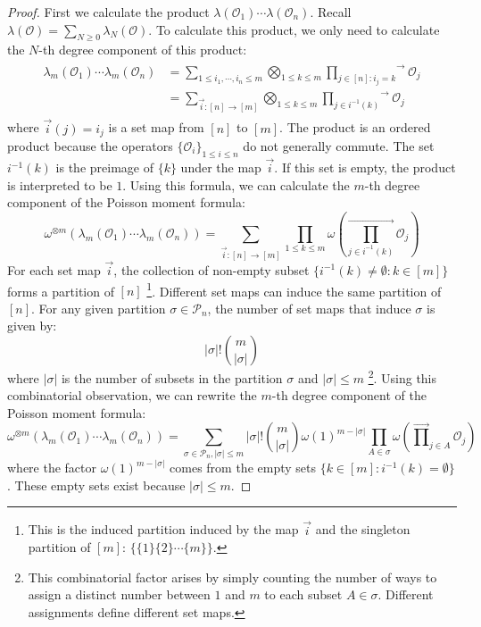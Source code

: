\documentclass[a4paper,11pt]{article}
\theoremstyle{definition}
\numberwithin{equation}{section}
\begin{document}
\begin{proof}
    First we calculate the product $\lambda(\mathcal{O}_1)\cdots\lambda(\mathcal{O}_n)$. Recall $\lambda(\mathcal{O}) = \sum_{N\geq 0}\lambda_N(\mathcal{O})$. To calculate this product, we only need to calculate the $N$-th degree component of this product:
    \begin{align}
        \begin{split}
            \lambda_m(\mathcal{O}_1)\cdots\lambda_m(\mathcal{O}_n) &= \sum_{1\leq i_1,\cdots,i_n\leq m}\bigotimes_{1\leq k\leq m}\overrightarrow{\prod_{j\in[n]:i_j = k}}\mathcal{O}_j
            \\& = \sum_{\vec{i}:[n]
            \rightarrow [m]}\bigotimes_{1\leq k\leq m}\overrightarrow{\prod_{j\in i^{-1}(k)}}\mathcal{O}_j
        \end{split}
    \end{align}
    where $\vec{i}(j) = i_j$ is a set map from $[n]$ to $[m]$. The product is an ordered product because the operators $\{\mathcal{O}_i\}_{1\leq i\leq n}$ do not generally commute. The set $i^{-1}(k)$ is the preimage of $\{k\}$ under the map $\vec{i}$. If this set is empty, the product is interpreted to be $1$. Using this formula, we can calculate the $m$-th degree component of the Poisson moment formula:
    \begin{equation}\label{equation:combinatorial_moment}
        \omega^{\otimes m}(\lambda_m(\mathcal{O}_1)\cdots\lambda_m(\mathcal{O}_n)) = \sum_{\vec{i}:[n]\rightarrow[m]}\prod_{1\leq k\leq m}\omega(\overrightarrow{\prod_{j\in i^{-1}(k)}}\mathcal{O}_j)
    \end{equation}
    For each set map $\vec{i}$, the collection of non-empty subset $\{i^{-1}(k)\neq\emptyset:k\in [m]\}$ forms a partition of $[n]$ \footnote{This is the induced partition induced by the map $\vec{i}$ and the singleton partition of $[m]$: $\{\{1\}\{2\}\cdots\{m\}\}$.}. Different set maps can induce the same partition of $[n]$. For any given partition $\sigma\in\mathcal{P}_n$, the number of set maps that induce $\sigma$ is given by:
    \begin{equation}
        |\sigma|!\binom{m}{|\sigma|}
    \end{equation}
    where $|\sigma|$ is the number of subsets in the partition $\sigma$ and $|\sigma| \leq m$ \footnote{This combinatorial factor arises by simply counting the number of ways to assign a distinct number between $1$ and $m$ to each subset $A\in \sigma$. Different assignments define different set maps.}. Using this combinatorial observation, we can rewrite the $m$-th degree component of the Poisson moment formula:
    \begin{equation}
        \omega^{\otimes m}(\lambda_m(\mathcal{O}_1)\cdots\lambda_m(\mathcal{O}_n)) = \sum_{\sigma\in\mathcal{P}_n, |\sigma| \leq m}|\sigma|!\binom{m}{|\sigma|}\omega(1)^{m - |\sigma|}\prod_{A\in\sigma}\omega(\overrightarrow{\prod}_{j\in A}\mathcal{O}_j)
    \end{equation}
    where the factor $\omega(1)^{m - |\sigma|}$ comes from the empty sets $\{k\in[m]: i^{-1}(k) = \emptyset\}$. These empty sets exist because $|\sigma|\leq m$.


\end{proof}
\end{document}
